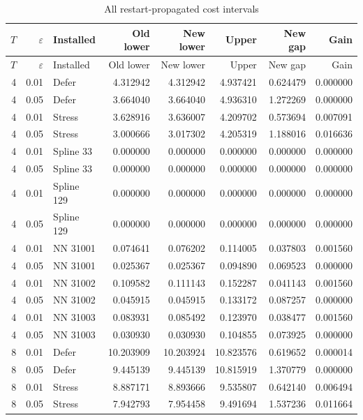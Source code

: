 \begingroup\footnotesize
\setlength{\tabcolsep}{3pt}
\begin{longtable}{rrlrrrrr}
\caption{All restart-propagated cost intervals}\label{tab:restart-all}\\
\toprule $T$ & $\varepsilon$ & Installed & Old lower & New lower & Upper & New gap & Gain \\ \midrule
\endfirsthead
\toprule $T$ & $\varepsilon$ & Installed & Old lower & New lower & Upper & New gap & Gain \\ \midrule
\endhead
4 & 0.01 & Defer & 4.312942 & 4.312942 & 4.937421 & 0.624479 & 0.000000 \\
4 & 0.05 & Defer & 3.664040 & 3.664040 & 4.936310 & 1.272269 & 0.000000 \\
4 & 0.01 & Stress & 3.628916 & 3.636007 & 4.209702 & 0.573694 & 0.007091 \\
4 & 0.05 & Stress & 3.000666 & 3.017302 & 4.205319 & 1.188016 & 0.016636 \\
4 & 0.01 & Spline 33 & 0.000000 & 0.000000 & 0.000000 & 0.000000 & 0.000000 \\
4 & 0.05 & Spline 33 & 0.000000 & 0.000000 & 0.000000 & 0.000000 & 0.000000 \\
4 & 0.01 & Spline 129 & 0.000000 & 0.000000 & 0.000000 & 0.000000 & 0.000000 \\
4 & 0.05 & Spline 129 & 0.000000 & 0.000000 & 0.000000 & 0.000000 & 0.000000 \\
4 & 0.01 & NN 31001 & 0.074641 & 0.076202 & 0.114005 & 0.037803 & 0.001560 \\
4 & 0.05 & NN 31001 & 0.025367 & 0.025367 & 0.094890 & 0.069523 & 0.000000 \\
4 & 0.01 & NN 31002 & 0.109582 & 0.111143 & 0.152287 & 0.041143 & 0.001560 \\
4 & 0.05 & NN 31002 & 0.045915 & 0.045915 & 0.133172 & 0.087257 & 0.000000 \\
4 & 0.01 & NN 31003 & 0.083931 & 0.085492 & 0.123970 & 0.038477 & 0.001560 \\
4 & 0.05 & NN 31003 & 0.030930 & 0.030930 & 0.104855 & 0.073925 & 0.000000 \\
8 & 0.01 & Defer & 10.203909 & 10.203924 & 10.823576 & 0.619652 & 0.000014 \\
8 & 0.05 & Defer & 9.445139 & 9.445139 & 10.815919 & 1.370779 & 0.000000 \\
8 & 0.01 & Stress & 8.887171 & 8.893666 & 9.535807 & 0.642140 & 0.006494 \\
8 & 0.05 & Stress & 7.942793 & 7.954458 & 9.491694 & 1.537236 & 0.011664 \\

\end{longtable}
